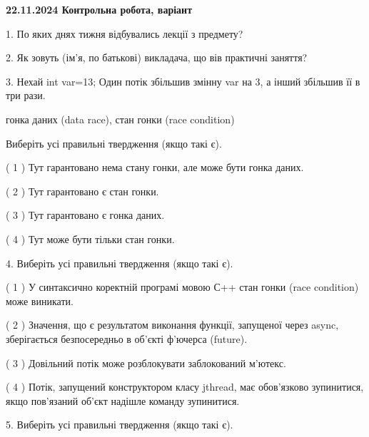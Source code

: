 \documentclass[12pt, ukrainian]{article}
\begin{document}
\vspace{4mm}
\newpage
\begin {large}

\textbf{22.11.2024 Контрольна робота, варіант  }\par


{
1. По яких днях тижня відбувались лекції з предмету?



\vspace{5mm}
2. Як зовуть (ім'я, по батькові) викладача, що вів практичні заняття?



\vspace{5mm}
3. Нехай int var=13; Один потік збільшив змінну var на 3, а інший збільшив її в три рази.

гонка даних (data race), стан гонки (race condition)

Виберіть усі правильні твердження (якщо такі є).\par
\vspace{2mm}
( 1 ) Тут гарантовано нема стану гонки, але може бути гонка даних.%

( 2 ) Тут гарантовано є стан гонки.%

( 3 ) Тут гарантовано є гонка даних.%

( 4 ) Тут може бути тільки стан гонки.%


\vspace{5mm}
4. Виберіть усі правильні твердження (якщо такі є).\par
\vspace{2mm}

( 1 ) У синтаксично коректній програмі мовою С++ стан гонки (race condition) може виникати.%

( 2 ) Значення, що є результатом виконання функції, запущеної через async, зберігається безпосередньо в об’єкті ф’ючерса (future).%

( 3 ) Довільний потік може розблокувати заблокований м’ютекс.%

( 4 ) Потік, запущений конструктором класу jthread, має обов’язково зупинитися, якщо пов’язаний об’єкт надішле команду зупинитися.%


\vspace{5mm}
5. Виберіть усі правильні твердження (якщо такі є).\par
\vspace{2mm}

}
\end{large}
\end{document}
